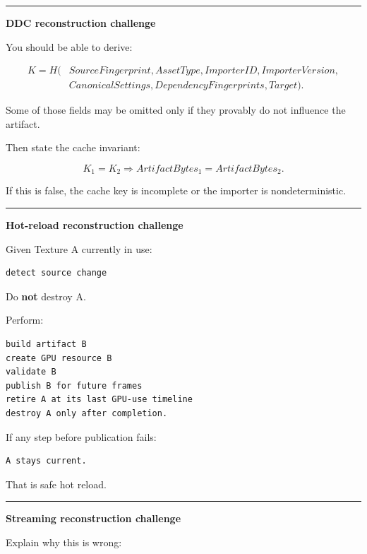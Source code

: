 \begin{center}\rule{0.5\linewidth}{0.5pt}\end{center}

\textbf{DDC reconstruction challenge}

You should be able to derive:

\[\begin{aligned}K=H(&SourceFingerprint,AssetType,ImporterID,ImporterVersion,\\&CanonicalSettings,DependencyFingerprints,Target).\end{aligned}\]

Some of those fields may be omitted only if they provably do not influence the artifact.

Then state the cache invariant:

\[
\boxed{
K_1=K_2
\Rightarrow
ArtifactBytes_1=ArtifactBytes_2.
}
\]

If this is false, the cache key is incomplete or the importer is nondeterministic.

\begin{center}\rule{0.5\linewidth}{0.5pt}\end{center}

\textbf{Hot-reload reconstruction challenge}

Given Texture A currently in use:

\begin{verbatim}
detect source change
\end{verbatim}

Do \textbf{not} destroy A.

Perform:

\begin{verbatim}
build artifact B
create GPU resource B
validate B
publish B for future frames
retire A at its last GPU-use timeline
destroy A only after completion.
\end{verbatim}

If any step before publication fails:

\begin{verbatim}
A stays current.
\end{verbatim}

That is safe hot reload.

\begin{center}\rule{0.5\linewidth}{0.5pt}\end{center}

\textbf{Streaming reconstruction challenge}

Explain why this is wrong:

